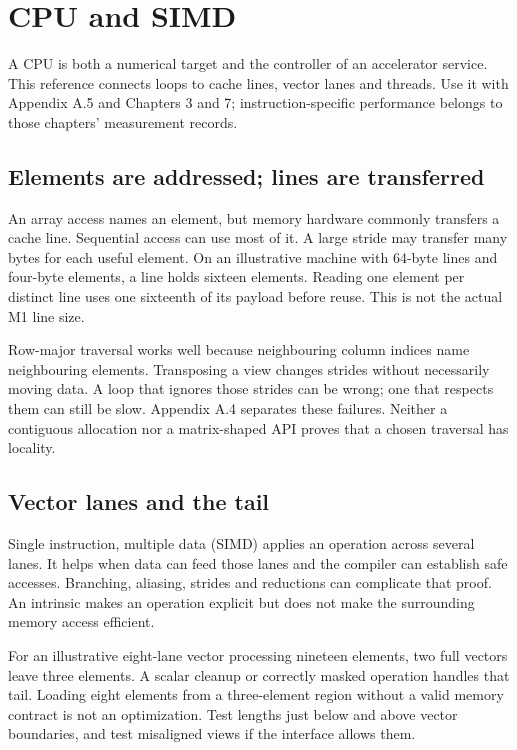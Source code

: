 \chapter{CPU and SIMD}\label{app:cpu}
\begin{ChapterIntent}
A CPU is both a numerical target and the controller of an accelerator
service. This reference connects loops to cache lines, vector lanes and
threads. Use it with Appendix A.5 and Chapters 3 and 7; instruction-specific
performance belongs to those chapters' measurement records.
\end{ChapterIntent}

\section{Elements are addressed; lines are transferred}
An array access names an element, but memory hardware commonly transfers
a cache line. Sequential access can use most of it. A large stride may
transfer many bytes for each useful element. On an illustrative machine
with 64-byte lines and four-byte elements, a line holds sixteen elements.
Reading one element per distinct line uses one sixteenth of its payload
before reuse. This is not the actual M1 line size.

Row-major traversal works well because neighbouring column indices name
neighbouring elements. Transposing a view changes strides without
necessarily moving data. A loop that ignores those strides can be wrong;
one that respects them can still be slow. Appendix A.4 separates these
failures. Neither a contiguous allocation nor a matrix-shaped API proves
that a chosen traversal has locality.

\section{Vector lanes and the tail}
Single instruction, multiple data (SIMD) applies an operation across
several lanes. It helps when data can feed those lanes and the compiler
can establish safe accesses. Branching, aliasing, strides and reductions
can complicate that proof. An intrinsic makes an operation explicit but
does not make the surrounding memory access efficient.

For an illustrative eight-lane vector processing nineteen elements, two
full vectors leave three elements. A scalar cleanup or correctly masked
operation handles that tail. Loading eight elements from a three-element
region without a valid memory contract is not an optimization. Test
lengths just below and above vector boundaries, and test misaligned views
if the interface allows them.


